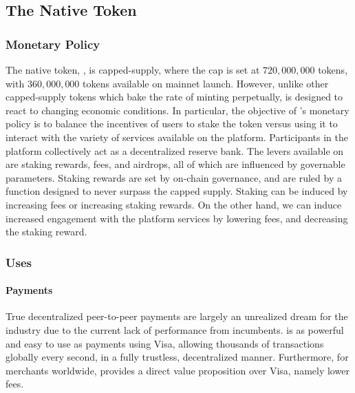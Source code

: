 \documentclass[runningheads]{llncs}
\begin{document}
\subsection{The \AVATokenName{} Native Token}

\subsubsection{Monetary Policy}
The native token, \AVATokenName{}, is capped-supply, where the cap is set at $720,000,000$ tokens, with $360,000,000$ tokens available on mainnet launch. However, unlike other capped-supply tokens which bake the rate of minting perpetually, \AVATokenName{} is designed to react to changing economic conditions. In particular, the objective of \AVATokenName{}'s monetary policy is to balance the incentives of users to stake the token versus using it to interact with the variety of services available on the platform. Participants in the platform collectively act as a decentralized reserve bank. The levers available on \AVAPlatformName{} are staking rewards, fees, and airdrops, all of which are influenced by governable parameters. Staking rewards are set by on-chain governance, and are ruled by a function designed to never surpass the capped supply. Staking can be induced by increasing fees or increasing staking rewards. On the other hand, we can induce increased engagement with the \AVAPlatformName{} platform services by lowering fees, and decreasing the staking reward. 

\subsubsection{Uses}
\paragraph{Payments}
True decentralized peer-to-peer payments are largely an unrealized dream for the industry due to the current lack of performance from incumbents. \AVATokenName{} is as powerful and easy to use as payments using Visa, allowing thousands of transactions globally every second, in a fully trustless, decentralized manner. Furthermore, for merchants worldwide, \AVATokenName{} provides a direct value proposition over Visa, namely lower fees.
\end{document}

